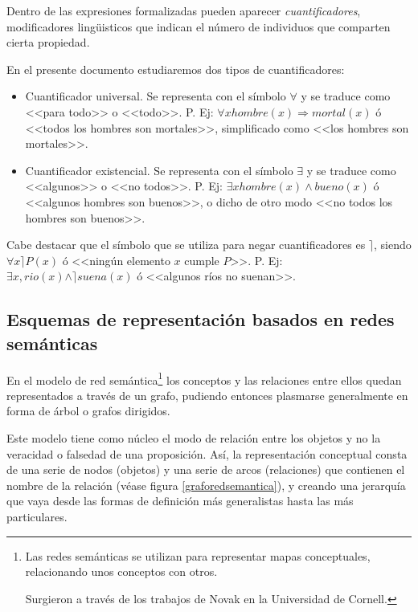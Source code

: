 \documentclass[a4paper, 11pt, titlepage]{article}
\begin{document}
            Dentro de las expresiones formalizadas pueden aparecer \textit{cuantificadores}, 
            modificadores lingüisticos que indican el número de individuos que comparten cierta propiedad.

            En el presente documento estudiaremos dos tipos de cuantificadores:

            \begin{itemize}
                \item Cuantificador universal. Se representa con el símbolo $\forall$ y se traduce como 
                <<para todo>> o <<todo>>. P. Ej: $\forall x hombre(x)\Rightarrow mortal(x)$ ó <<todos los hombres 
                son mortales>>, simplificado como <<los hombres son mortales>>.
                \item Cuantificador existencial. Se representa con el símbolo $\exists$ y se traduce como 
                <<algunos>> o <<no todos>>. P. Ej: $\exists x hombre(x) \land bueno(x)$ ó <<algunos hombres 
                son buenos>>, o dicho de otro modo <<no todos los hombres son buenos>>.
            \end{itemize}

            Cabe destacar que el símbolo que se utiliza para negar cuantificadores es $\rceil$, siendo 
            $\forall x \rceil P(x)$ ó <<ningún elemento $x$ cumple $P$>>. P. Ej: 
            $\exists x, rio(x) \land \rceil suena(x)$ ó <<algunos ríos no suenan>>.

    \subsection{Esquemas de representación basados en redes semánticas}
        
        En el modelo de red semántica\footnote{
            Las redes semánticas se utilizan para representar mapas conceptuales, relacionando 
            unos conceptos con otros.

            Surgieron a través de los trabajos de Novak en la Universidad de Cornell.
        } los conceptos y las relaciones entre ellos quedan 
        representados a través de un grafo, pudiendo entonces plasmarse generalmente en forma 
        de árbol o grafos dirigidos.

        Este modelo tiene como núcleo el modo de relación entre los objetos y no la veracidad 
        o falsedad de una proposición. Así, la representación conceptual consta de una serie de 
        nodos (objetos) y una serie de arcos (relaciones) que contienen el nombre de la relación
        (véase figura \ref{graforedsemantica}), y creando una jerarquía que vaya desde las 
        formas de definición más generalistas hasta las más particulares.
\end{document}
